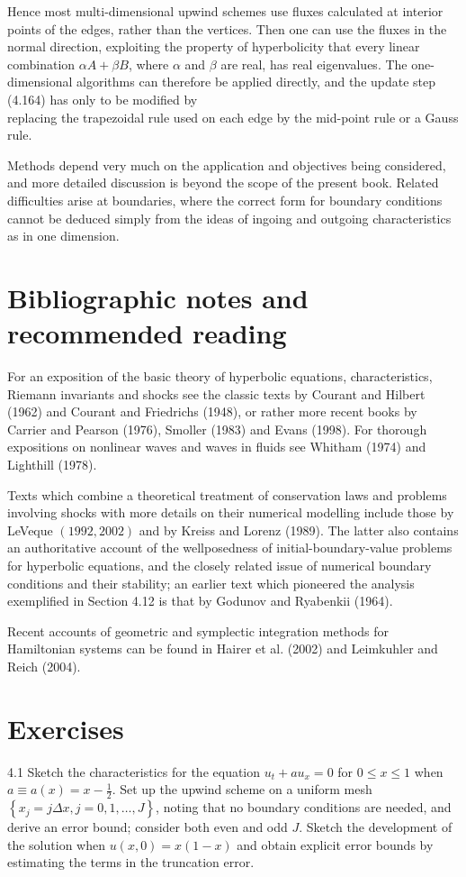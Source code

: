 \documentclass[10pt]{article}
\begin{document}
Hence most multi-dimensional upwind schemes use fluxes calculated at interior points of the edges, rather than the vertices. Then one can use the fluxes in the normal direction, exploiting the property of hyperbolicity that every linear combination \(\alpha A+\beta B\), where \(\alpha\) and \(\beta\) are real, has real eigenvalues. The one-dimensional algorithms can therefore be applied directly, and the update step (4.164) has only to be modified by\\
replacing the trapezoidal rule used on each edge by the mid-point rule or a Gauss rule.

Methods depend very much on the application and objectives being considered, and more detailed discussion is beyond the scope of the present book. Related difficulties arise at boundaries, where the correct form for boundary conditions cannot be deduced simply from the ideas of ingoing and outgoing characteristics as in one dimension.

\section*{Bibliographic notes and recommended reading}
For an exposition of the basic theory of hyperbolic equations, characteristics, Riemann invariants and shocks see the classic texts by Courant and Hilbert (1962) and Courant and Friedrichs (1948), or rather more recent books by Carrier and Pearson (1976), Smoller (1983) and Evans (1998). For thorough expositions on nonlinear waves and waves in fluids see Whitham (1974) and Lighthill (1978).

Texts which combine a theoretical treatment of conservation laws and problems involving shocks with more details on their numerical modelling include those by LeVeque \((1992,2002)\) and by Kreiss and Lorenz (1989). The latter also contains an authoritative account of the wellposedness of initial-boundary-value problems for hyperbolic equations, and the closely related issue of numerical boundary conditions and their stability; an earlier text which pioneered the analysis exemplified in Section 4.12 is that by Godunov and Ryabenkii (1964).

Recent accounts of geometric and symplectic integration methods for Hamiltonian systems can be found in Hairer et al. (2002) and Leimkuhler and Reich (2004).

\section*{Exercises}
4.1 Sketch the characteristics for the equation \(u_{t}+a u_{x}=0\) for \(0 \leq x \leq 1\) when \(a \equiv a(x)=x-\frac{1}{2}\). Set up the upwind scheme on a uniform mesh \(\left\{x_{j}=j \Delta x, j=0,1, \ldots, J\right\}\), noting that no boundary conditions are needed, and derive an error bound; consider both even and odd \(J\). Sketch the development of the solution when \(u(x, 0)=x(1-x)\) and obtain explicit error bounds by estimating the terms in the truncation error.
\end{document}
